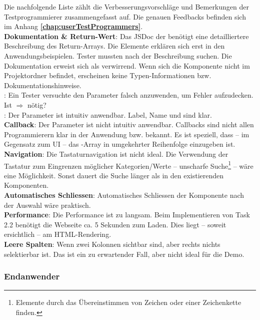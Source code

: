 Die nachfolgende Liste zählt die Verbesserungsvorschläge und Bemerkungen der Testprogrammierer zusammengefasst auf. 
Die genauen Feedbacks befinden sich im Anhang \textbf{\ref{chap:userTestProgrammers}}. 
 \\
\textbf{Dokumentation \& Return-Wert}: 
Das JSDoc der  benötigt eine detailliertere Beschreibung des Return-Arrays. 
Die Elemente erklären sich erst in den Anwendungsbeispielen. 
Tester mussten nach der Beschreibung suchen. 
Die Dokumentation erweist sich als verwirrend. 
Wenn sich die Komponente nicht im Projektordner befindet, erscheinen keine Typen-Informationen bzw. Dokumentationshinweise. 
\\
: 
Ein Tester versuchte den Parameter falsch anzuwenden, um Fehler aufzudecken. 
Ist  $\Rightarrow$  nötig? 
\\
: 
Der Parameter ist intuitiv anwendbar. 
Label, Name und  sind klar. 
\\
\textbf{Callback}: 
Der Parameter ist nicht intuitiv anwendbar. 
Callbacks sind nicht allen Programmierern klar in der Anwendung bzw. bekannt. 
Es ist speziell, dass – im Gegensatz zum UI – das -Array in umgekehrter Reihenfolge einzugeben ist. 
\\
\textbf{Navigation}: 
Die Tastaturnavigation ist nicht ideal. 
Die Verwendung der Tastatur zum Eingrenzen möglicher Kategorien/Werte – unscharfe Suche\footnote{
    Elemente durch das Übereinstimmen von Zeichen oder einer Zeichenkette finden.
} – wäre eine Möglichkeit. 
Sonst dauert die Suche länger als in den existierenden Komponenten. 
\\
\textbf{Automatisches Schliessen}: 
Automatisches Schliessen der Komponente nach der Auswahl wäre praktisch. 
\\
\textbf{Performance}: 
Die Performance ist zu langsam. 
Beim Implementieren von Task 2.2 benötigt die Webseite ca. 5 Sekunden zum Laden. 
Dies liegt – soweit ersichtlich – am HTML-Rendering. 
\\
\textbf{Leere Spalten}: 
Wenn zwei Kolonnen sichtbar sind, aber rechts nichts selektierbar ist. 
Das ist ein zu erwartender Fall, aber nicht ideal für die Demo. 


\subsubsection{\color{dblue} Endanwender}
\label{sec:userTestsEnduser}

